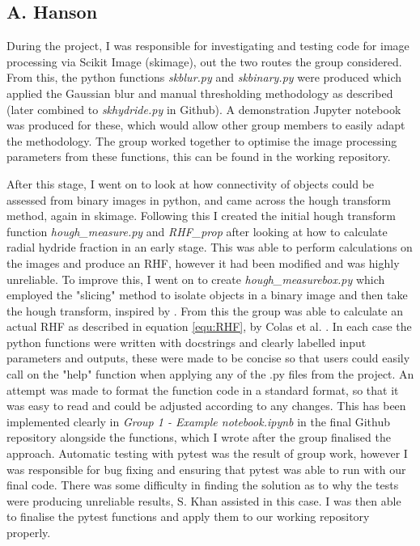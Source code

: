 \documentclass{article}
\begin{document}
\subsection{A. Hanson}
During the project, I was responsible for investigating and testing code for image processing via Scikit Image (skimage), out the two routes the group considered. From this, the python functions \textit{skblur.py} and \textit{skbinary.py} were produced which applied the Gaussian blur and manual thresholding methodology as described (later combined to \textit{skhydride.py} in Github). A demonstration Jupyter notebook was produced for these, which would allow other group members to easily adapt the methodology. The group worked together to optimise the image processing parameters from these functions, this can be found in the working repository.

After this stage, I went on to look at how connectivity of objects could be assessed from binary images in python, and came across the hough transform method, again in skimage. Following this I created the initial hough transform function \textit{hough\_measure.py} and \textit{RHF\_prop} after looking at how to calculate radial hydride fraction in an early stage. This was able to perform calculations on the images and produce an RHF, however it had been modified and was highly unreliable. To improve this, I went on to create \textit{hough\_measurebox.py} which employed the "slicing" method to isolate objects in a binary image and then take the hough transform, inspired by \cite{Maric2021}. From this the group was able to calculate an actual RHF as described in equation \ref{equ:RHF}, by Colas et al. \cite{Colas2013}. In each case the python functions were written with docstrings and clearly labelled input parameters and outputs, these were made to be concise so that users could easily call on the "help" function when applying any of the .py files from the project. An attempt was made to format the function code in a standard format, so that it was easy to read and could be adjusted according to any changes. This has been implemented clearly in \textit{Group 1 - Example notebook.ipynb} in the final Github repository alongside the functions, which I wrote after the group finalised the approach. Automatic testing with pytest was the result of group work, however I was responsible for bug fixing and ensuring that pytest was able to run with our final code. There was some difficulty in finding the solution as to why the tests were producing unreliable results, S. Khan assisted in this case. I was then able to finalise the pytest functions and apply them to our working repository properly.
\end{document}

